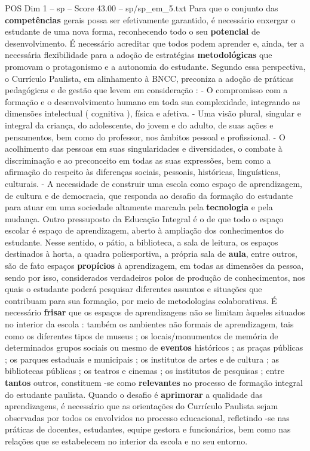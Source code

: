 \begin{textsample}{POS Dim 1 – sp – Score 43.00 – sp/sp\_em\_5.txt}
Para que o conjunto das \textbf{competências} gerais possa ser efetivamente garantido, é necessário enxergar o estudante de uma nova forma, reconhecendo todo o seu \textbf{potencial} de desenvolvimento.
É necessário acreditar que todos podem aprender e, ainda, ter a necessária flexibilidade para a adoção de estratégias \textbf{metodológicas} que promovam o protagonismo e a autonomia do estudante.
Segundo essa perspectiva, o Currículo Paulista, em alinhamento à BNCC, preconiza a adoção de práticas pedagógicas e de gestão que levem em consideração : - O compromisso com a formação e o desenvolvimento humano em toda sua complexidade, integrando as dimensões intelectual ( cognitiva ), física e afetiva. - Uma visão plural, singular e integral da criança, do adolescente, do jovem e do adulto, de suas ações e pensamentos, bem como do professor, nos âmbitos pessoal e profissional. - O acolhimento das pessoas em suas singularidades e diversidades, o combate à discriminação e ao preconceito em todas as suas expressões, bem como a afirmação do respeito às diferenças sociais, pessoais, históricas, linguísticas, culturais. - A necessidade de construir uma escola como espaço de aprendizagem, de cultura e de democracia, que responda ao desafio da formação do estudante para atuar em uma sociedade altamente marcada pela \textbf{tecnologia} e pela mudança.
Outro pressuposto da Educação Integral é o de que todo o espaço escolar é espaço de aprendizagem, aberto à ampliação dos conhecimentos do estudante.
Nesse sentido, o pátio, a biblioteca, a sala de leitura, os espaços destinados à horta, a quadra poliesportiva, a própria sala de \textbf{aula}, entre outros, são de fato espaços \textbf{propícios} à aprendizagem, em todas as dimensões da pessoa, sendo por isso, considerados verdadeiros polos de produção de conhecimentos, nos quais o estudante poderá pesquisar diferentes assuntos e situações que contribuam para sua formação, por meio de metodologias colaborativas.
É necessário \textbf{frisar} que os espaços de aprendizagens não se limitam àqueles situados no interior da escola : também os ambientes não formais de aprendizagem, tais como os diferentes tipos de museus ; os locais/monumentos de memória de determinados grupos sociais ou mesmo de \textbf{eventos} históricos ; as praças públicas ; os parques estaduais e municipais ; os institutos de artes e de cultura ; as bibliotecas públicas ; os teatros e cinemas ; os institutos de pesquisas ; entre \textbf{tantos} outros, constituem -se como \textbf{relevantes} no processo de formação integral do estudante paulista.
Quando o desafio é \textbf{aprimorar} a qualidade das aprendizagens, é necessário que as orientações do Currículo Paulista sejam observadas por todos os envolvidos no processo educacional, refletindo -se nas práticas de docentes, estudantes, equipe gestora e funcionários, bem como nas relações que se estabelecem no interior da escola e no seu entorno.

\end{textsample}

